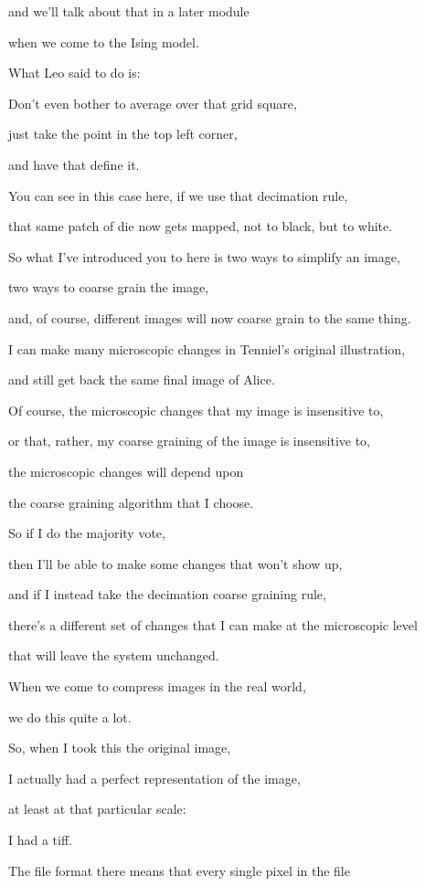 \documentclass[]{article}
\begin{document}
and we'll talk about that
in a later module

when we come to the Ising model.

What Leo said to do is:

Don't even bother
to average over that grid square,

just take the point
in the top left corner,

and have that define it.

You can see in this case here,
if we use that decimation rule,

that same patch of die now gets mapped,
not to black, but to white.

So what I've introduced you to here
is two ways to simplify an image,

two ways to coarse grain the image,

and, of course, different images
will now coarse grain to the same thing.

I can make many microscopic changes
in Tenniel's original illustration,

and still get back
the same final image of Alice.

Of course, the microscopic changes
that my image is insensitive to,

or that, rather, my coarse graining
of the image is insensitive to,

the microscopic changes will depend upon

the coarse graining algorithm
that I choose.

So if I do the majority vote,

then I'll be able to make some changes
that won't show up,

and if I instead take
the decimation coarse graining rule,

there's a different set of changes
that I can make at the microscopic level

that will leave the system unchanged.

When we come to compress images
in the real world,

we do this quite a lot.

So, when I took this the original image,

I actually had a perfect
representation of the image,

at least at that particular scale:

I had a tiff.

The file format there means
that every single pixel in the file
\end{document}
